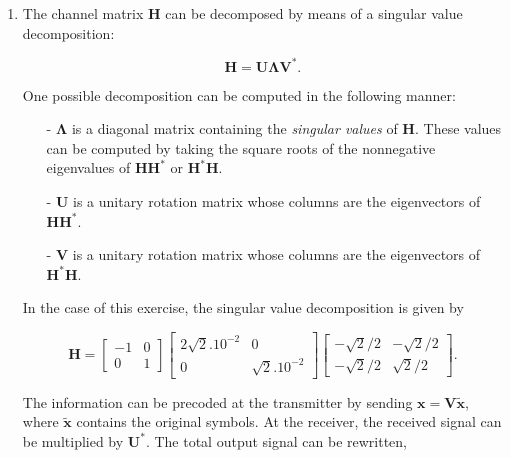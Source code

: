 \documentclass [a4paper, 11pt] {article}
\begin{document}
    \begin{solution}

        \begin{enumerate}
        \item The channel matrix $\mathbf{H}$ can be decomposed by means of a singular value decomposition:

        \begin{equation}\mathbf{H} = \mathbf{U}\mathbf{\Lambda}\mathbf{V}^*.\end{equation}

        One possible decomposition can be computed in the following manner:

        \begin{itemize}
            \item[-] $\mathbf{\Lambda}$ is a diagonal matrix containing the \textit{singular values} of $\mathbf{H}$. These values can be computed by taking the square roots of the nonnegative eigenvalues of $\mathbf{H}\mathbf{H}^*$ or $\mathbf{H}^*\mathbf{H}$.
            \item[-] $\mathbf{U}$ is a unitary rotation matrix whose columns are the eigenvectors of  $\mathbf{H}\mathbf{H}^*$.
            \item[-] $\mathbf{V}$ is a unitary rotation matrix whose columns are the eigenvectors of  $\mathbf{H}^*\mathbf{H}$.
        \end{itemize}

        In the case of this exercise, the singular value decomposition is given by

        \begin{equation}
            \mathbf{H} = \begin{bmatrix} -1 & 0 \\ 0 & 1 \end{bmatrix} \begin{bmatrix} 2\sqrt{2}. 10^{-2} & 0 \\ 0 & \sqrt{2}. 10^{-2} \end{bmatrix} \begin{bmatrix} -\sqrt{2}/2 & -\sqrt{2}/2 \\ -\sqrt{2}/2 & \sqrt{2}/2 \end{bmatrix}.
        \end{equation}

        The information can be precoded at the transmitter by sending $\mathbf{x} = \mathbf{V}\mathbf{\tilde{x}}$, where $\mathbf{\tilde{x}}$ contains the original symbols. At the receiver, the received signal can be multiplied by $\mathbf{U}^*$. The total output signal can be rewritten,


\end{enumerate}
\end{solution}
\end{document}

